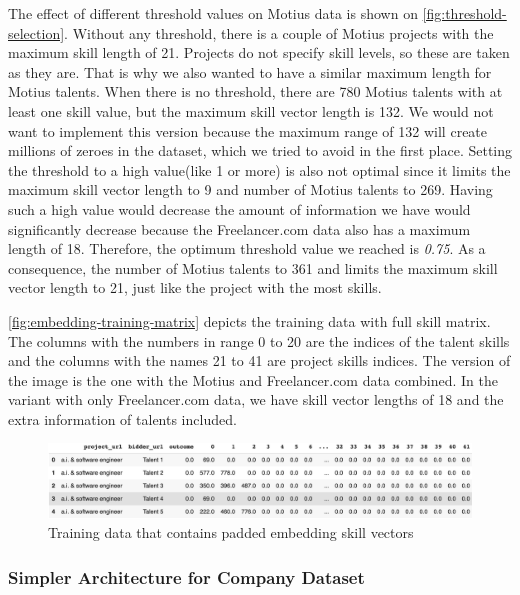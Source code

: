 The effect of different threshold values on Motius data is shown on \autoref{fig:threshold-selection}. Without any threshold, there is a couple of Motius projects with the maximum skill length of 21. Projects do not specify skill levels, so these are taken as they are. That is why we also wanted to have a similar maximum length for Motius talents. When there is no threshold, there are 780 Motius talents with at least one skill value, but the maximum skill vector length is 132. We would not want to implement this version because the maximum range of 132 will create millions of zeroes in the dataset, which we tried to avoid in the first place. Setting the threshold to a high value(like 1 or more) is also not optimal since it limits the maximum skill vector length to 9 and number of Motius talents to 269. Having such a high value would decrease the amount of information we have would significantly decrease because the Freelancer.com data also has a maximum length of 18. Therefore, the optimum threshold value we reached is \textit{0.75}. As a consequence, the number of Motius talents to 361 and limits the maximum skill vector length to 21, just like the project with the most skills.

\autoref{fig:embedding-training-matrix} depicts the training data with full skill matrix. The columns with the numbers in range 0 to 20 are the indices of the talent skills and the columns with the names 21 to 41 are project skills indices.  The version of the image is the one with the Motius and Freelancer.com data combined. In the variant with only Freelancer.com data, we have skill vector lengths of 18 and the extra information of talents included.

\begin{figure}[htp]
	\centering
	\includegraphics[width=\textwidth]{figures/EmbeddingTrainingMatrix.png}
	\caption{Training data that contains padded embedding skill vectors}
	\label{fig:embedding-training-matrix}
\end{figure}



\subsubsection{Simpler Architecture for Company Dataset}

